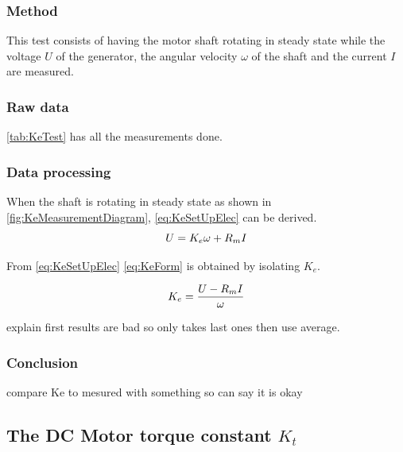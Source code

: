 \subsubsection*{Method}
This test consists of having the motor shaft rotating in steady state while the voltage $U$ of the generator, the angular velocity $\omega$ of the shaft and the current $I$ are measured.

\subsubsection*{Raw data}
\autoref{tab:KeTest} has all the measurements done.


\subsubsection*{Data processing}

When the shaft is rotating in steady state as shown in \autoref{fig:KeMeasurementDiagram}, \autoref{eq:KeSetUpElec} can be derived.
\begin{equation}
U=K_e\omega+R_m I \addunit{V}
\label{eq:KeSetUpElec}
\end{equation}
\startexplain
{}
\stopexplain

From \autoref{eq:KeSetUpElec} \autoref{eq:KeForm} is obtained by isolating $K_e$.

\begin{equation}
K_e=\frac{U-R_m I}{\omega} \addunit{\volt\per\radian\second}
\label{eq:KeForm}
\end{equation}

explain first results are bad so only takes last ones then use average.

\subsubsection*{Conclusion}

compare Ke to mesured with something so can say it is okay

\subsection{The DC Motor torque constant $K_t$}


